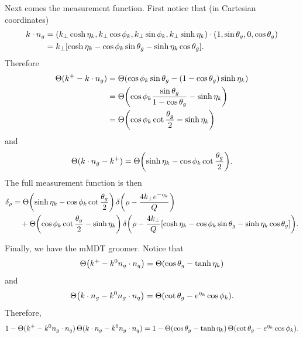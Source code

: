 \documentclass[11pt,twoside,reqno]{amsart}
\theoremstyle{plain}
\theoremstyle{remark}
\theoremstyle{definition}
\theoremstyle{remark}
\theoremstyle{definition}
\theoremstyle{definition}
\begin{document}
	Next comes the measurement function. First notice that (in Cartesian coordinates)
	\begin{equation}\label{eq:k dot ng coordinates}
	\begin{aligned}
		k \cdot n_g &= (k_\perp \cosh\eta_k, k_\perp \cos\phi_k, k_\perp \sin\phi_k, k_\perp\sinh\eta_k) \cdot (1, \sin\theta_g, 0, \cos\theta_g) \\
		&= k_\perp \qty[\cosh\eta_k - \cos\phi_k \sin\theta_g - \sinh\eta_k \cos\theta_g].
	\end{aligned}
	\end{equation}
	Therefore
	\begin{equation}
	\begin{aligned}
		\Theta(k^+ - k\cdot n_g) &= \Theta\qty(\cos\phi_k \sin\theta_g - (1- \cos\theta_g)\sinh\eta_k) \\
		&= \Theta\qty(\cos\phi_k\frac{\sin\theta_g}{1 - \cos\theta_g} - \sinh\eta_k) \\
		&= \Theta\qty(\cos\phi_k\cot\frac{\theta_g}{2} - \sinh\eta_k)
	\end{aligned}
	\end{equation}
	and
	\begin{equation}
		\Theta(k\cdot n_g - k^+) = \Theta\qty(\sinh\eta_k - \cos\phi_k\cot\frac{\theta_g}{2}).
	\end{equation}
	The full measurement function is then
	\begin{equation}
	\begin{aligned}
		\delta_\rho &= \Theta\qty(\sinh\eta_k - \cos\phi_k\cot\frac{\theta_g}{2})\,\delta\qty(\rho - \frac{4 k_\perp e^{-\eta_k}}{Q}) \\
			&\quad+ \Theta\qty(\cos\phi_k\cot\frac{\theta_g}{2} - \sinh\eta_k)\, \delta\qty(\rho - \frac{4 k_\perp}{Q}\qty[\cosh\eta_k - \cos\phi_k\sin\theta_g - \sinh\eta_k\cos\theta_g]).
	\end{aligned}
	\end{equation}

	Finally, we have the mMDT groomer. Notice that
	\begin{equation}
		\Theta\qty(k^+ - k^0 n_g \cdot n_q) = \Theta(\cos\theta_g - \tanh\eta_k)
	\end{equation}
	and
	\begin{equation}
		\Theta\qty(k\cdot n_g - k^0 n_g \cdot n_q) = \Theta\qty(\cot\theta_g - e^{\eta_k}\cos\phi_k).
	\end{equation}
	Therefore,
	\begin{equation}
		1 - \Theta(k^+ - k^0 n_g \cdot n_q)\,\Theta(k \cdot n_g - k^0 n_g \cdot n_q) = 1 - \Theta(\cos\theta_g - \tanh\eta_k)\,\Theta\qty(\cot\theta_g - e^{\eta_k}\cos\phi_k).
	\end{equation}
\end{document}
